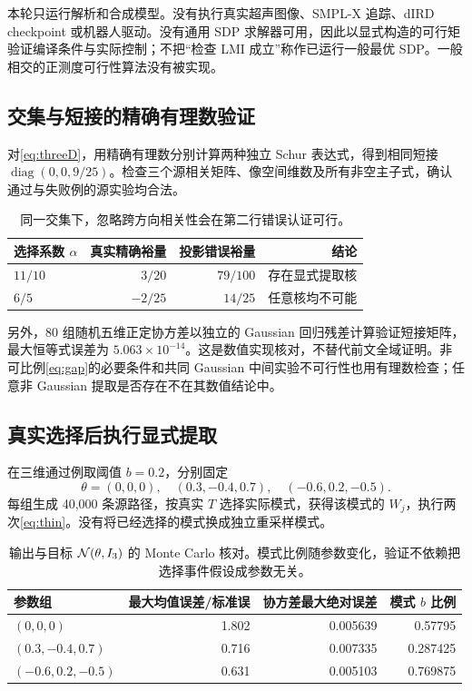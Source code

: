 \documentclass[UTF8,fontset=fandol,11pt,a4paper]{ctexart}
\DeclareMathOperator{\diag}{diag}\DeclareMathOperator{\tr}{tr}\DeclareMathOperator{\TV}{TV}
\theoremstyle{definition}\newtheorem{definition}[theorem]{定义}\newtheorem{assumption}[theorem]{条件}
\numberwithin{equation}{section}
\begin{document}
本轮只运行解析和合成模型。没有执行真实超声图像、SMPL-X 追踪、dIRD checkpoint 或机器人驱动。没有通用 SDP 求解器可用，因此以显式构造的可行矩验证编译条件与实际控制；不把“检查 LMI 成立”称作已运行一般最优 SDP。一般相交的正测度可行性算法没有被实现。

\subsection{交集与短接的精确有理数验证}
对\eqref{eq:threeD}，用精确有理数分别计算两种独立 Schur 表达式，得到相同短接 $\diag(0,0,9/25)$。检查三个源相关矩阵、像空间维数及所有非空主子式，确认通过与失败例的源实验均合法。

\begin{table}[ht]\centering\small
\begin{tabular}{lrrr}
\toprule
选择系数 $\alpha$ & 真实精确裕量 & 投影错误裕量 & 结论\\\midrule
$11/10$ & $3/20$ & $79/100$ & 存在显式提取核\\
$6/5$ & $-2/25$ & $14/25$ & 任意核均不可能\\
\bottomrule
\end{tabular}
\caption{同一交集下，忽略跨方向相关性会在第二行错误认证可行。}
\end{table}

另外，80 组随机五维正定协方差以独立的 Gaussian 回归残差计算验证短接矩阵，最大恒等式误差为 $5.063\times10^{-14}$。这是数值实现核对，不替代前文全域证明。非可比例\eqref{eq:gap}的必要条件和共同 Gaussian 中间实验不可行性也用有理数检查；任意非 Gaussian 提取是否存在不在其数值结论中。

\subsection{真实选择后执行显式提取}
在三维通过例取阈值 $b=0.2$，分别固定
\[
\theta=(0,0,0),\quad(0.3,-0.4,0.7),\quad(-0.6,0.2,-0.5).
\]
每组生成 40,000 条源路径，按真实 $T$ 选择实际模式，获得该模式的 $W_j$，执行两次\eqref{eq:thin}。没有将已经选择的模式换成独立重采样模式。

\begin{table}[ht]\centering\small
\begin{tabular}{lrrr}
\toprule
参数组 & 最大均值误差/标准误 & 协方差最大绝对误差 & 模式 $b$ 比例\\\midrule
$(0,0,0)$ & 1.802 & 0.005639 & 0.57795\\
$(0.3,-0.4,0.7)$ & 0.716 & 0.007335 & 0.287425\\
$(-0.6,0.2,-0.5)$ & 0.631 & 0.005103 & 0.769875\\
\bottomrule
\end{tabular}
\caption{输出与目标 $\mathcal N(\theta,I_3)$ 的 Monte Carlo 核对。模式比例随参数变化，验证不依赖把选择事件假设成参数无关。}
\end{table}
\end{document}
